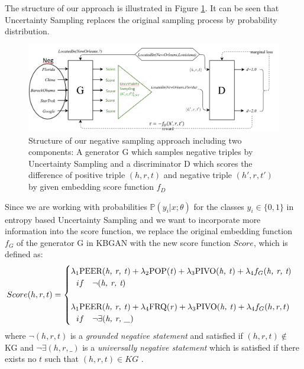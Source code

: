 The structure of our approach is illustrated in Figure \ref{fig:architecture}.
It can be seen that Uncertainty Sampling replaces the original sampling process by probability distribution.
\begin{figure}
    \centering
    \includegraphics[width=\textwidth]{figures/architecture.png}
    \caption{Structure of our negative sampling approach including two components:
    A generator G which samples negative triples by Uncertainty Sampling and a discriminator D which scores the difference of positive triple $(h,r,t)$ and negative triple $(h',r,t')$ by given embedding score function $f_D$}
    \label{fig:architecture}
\end{figure}
Since we are working with probabilities $\mathds{P}(y_i | x; \theta)$ for the classes $y_i \in \{0, 1\}$ in entropy based Uncertainty Sampling and we want to incorporate more information into the score function, we replace the original embedding function $f_G$ of the generator G in \ac{KBGAN} with the new score function $Score$, which is defined as:
\begin{equation*}
    Score(h, r, t)=
    \begin{cases}
         \lambda_1 \text{PEER(\textit{h, r, t})} + \lambda_2 \text{POP(\textit{t})} + \lambda_3 \text{PIVO(\textit{h, t})} + \lambda_4 f_G(\textit{h, r, t})
         \\ \ \ 
         if\ \ \ \neg(\textit{h, r, t})
         \\ \\
         \lambda_1 \text{PEER(\textit{h, r, t})} + \lambda_4 \text{FRQ(\textit{r})} + \lambda_3 \text{PIVO(\textit{h, t})} + \lambda_4 f_G(h, r, t)
         \\ \ \ 
         if\ \ \ \neg \exists (\textit{h, r, \_})
         \\
    \end{cases}
\end{equation*}
where  $\neg (h, r, t)$ is a \textit{grounded negative statement} and satisfied if $(h, r, t) \notin$ KG and $\neg\exists(h, r, \_)$ is a \textit{universally negative statement} which is satisfied if there exists no $t$ such that $(h, r, t) \in KG$ \cite{arnaout2020enriching}.\\
